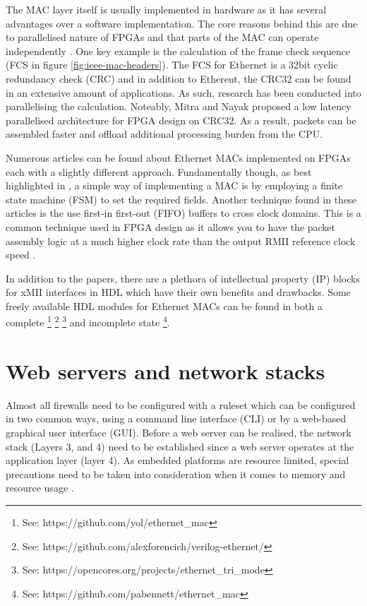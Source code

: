 The MAC layer itself is usually implemented in hardware as it has several advantages over a software implementation. The core reasons behind this are due to parallelised nature of FPGAs and that parts of the MAC can operate independently \cite{reducedEtherentMacFPGA}. One key example is the calculation of the 
frame check sequence (FCS in figure \ref{fig:ieee-mac-headers}). The FCS for Ethernet is a 32bit cyclic redundancy check (CRC) \cite{IEEE802.3-2012} and 
in addition to Etherent, the CRC32 can be found in an extensive amount of applications. As such, research has been conducted into parallelising the calculation. 
Noteably, Mitra and Nayak \cite{ParallelCRC} proposed a low latency parallelised architecture for FPGA design on CRC32. As a result, packets can be assembled 
faster and offload additional processing burden from the CPU. 


Numerous articles \cite{OptimisedEthernetMAC} \cite{EthernetAXI} \cite{EthernetRMII} can be found about Ethernet MACs implemented 
on FPGAs each with a slightly different approach. Fundamentally though, as best highlighted in \cite{OptimisedEthernetMAC}, a simple way of implementing a MAC is by employing a finite state 
machine (FSM) to set the required fields. Another technique found in these articles is the use first-in first-out (FIFO) buffers to cross clock domains. This is a common technique used 
in FPGA design as it allows you to have the packet assembly logic at a much higher clock rate than the output RMII reference clock speed \cite{EthernetAXI}. 

In addition to the papers, there are a plethora of intellectual property (IP) blocks for xMII interfaces in HDL 
which have their own benefits and drawbacks. Some freely available HDL modules for Ethernet MACs can be found in both a complete \footnote[1]{See: https://github.com/yol/ethernet\_mac} \footnote[2]{See: https://github.com/alexforencich/verilog-ethernet/} 
\footnote[3]{See: https://opencores.org/projects/ethernet\_tri\_mode} and incomplete state
\footnote[4]{See: https://github.com/pabennett/ethernet\_mac}.






\section{Web servers and network stacks}

Almost all firewalls need to be configured with a ruleset which can be configured in two common ways, using a command line interface (CLI) 
or by a web-based graphical user interface (GUI). Before a web server can be realised, the network stack (Layers 3, and 4) need to be established since a web server 
operates at the application layer (layer 4). As embedded platforms are resource limited, special precautions need to be taken into consideration when it comes to memory and resource 
usage \cite{OptimCortexLwIP}.

